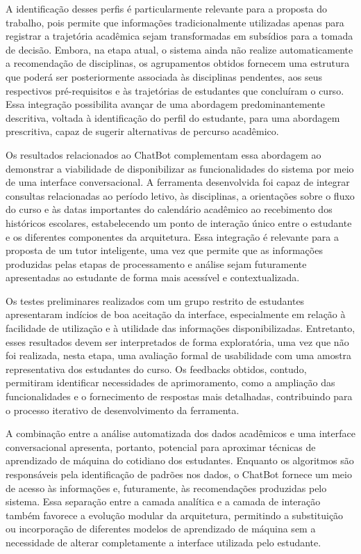 A identificação desses perfis é particularmente relevante para a proposta do trabalho, pois permite que informações tradicionalmente utilizadas apenas para registrar a trajetória acadêmica sejam transformadas em subsídios para a tomada de decisão. Embora, na etapa atual, o sistema ainda não realize automaticamente a recomendação de disciplinas, os agrupamentos obtidos fornecem uma estrutura que poderá ser posteriormente associada às disciplinas pendentes, aos seus respectivos pré-requisitos e às trajetórias de estudantes que concluíram o curso. Essa integração possibilita avançar de uma abordagem predominantemente descritiva, voltada à identificação do perfil do estudante, para uma abordagem prescritiva, capaz de sugerir alternativas de percurso acadêmico.

Os resultados relacionados ao ChatBot complementam essa abordagem ao demonstrar a viabilidade de disponibilizar as funcionalidades do sistema por meio de uma interface conversacional. A ferramenta desenvolvida foi capaz de integrar consultas relacionadas ao período letivo, às disciplinas, a orientações sobre o fluxo do curso e às datas importantes do calendário acadêmico ao recebimento dos históricos escolares, estabelecendo um ponto de interação único entre o estudante e os diferentes componentes da arquitetura. Essa integração é relevante para a proposta de um tutor inteligente, uma vez que permite que as informações produzidas pelas etapas de processamento e análise sejam futuramente apresentadas ao estudante de forma mais acessível e contextualizada.

Os testes preliminares realizados com um grupo restrito de estudantes apresentaram indícios de boa aceitação da interface, especialmente em relação à facilidade de utilização e à utilidade das informações disponibilizadas. Entretanto, esses resultados devem ser interpretados de forma exploratória, uma vez que não foi realizada, nesta etapa, uma avaliação formal de usabilidade com uma amostra representativa dos estudantes do curso. Os feedbacks obtidos, contudo, permitiram identificar necessidades de aprimoramento, como a ampliação das funcionalidades e o fornecimento de respostas mais detalhadas, contribuindo para o processo iterativo de desenvolvimento da ferramenta.

A combinação entre a análise automatizada dos dados acadêmicos e uma interface conversacional apresenta, portanto, potencial para aproximar técnicas de aprendizado de máquina do cotidiano dos estudantes. Enquanto os algoritmos são responsáveis pela identificação de padrões nos dados, o ChatBot fornece um meio de acesso às informações e, futuramente, às recomendações produzidas pelo sistema. Essa separação entre a camada analítica e a camada de interação também favorece a evolução modular da arquitetura, permitindo a substituição ou incorporação de diferentes modelos de aprendizado de máquina sem a necessidade de alterar completamente a interface utilizada pelo estudante.
